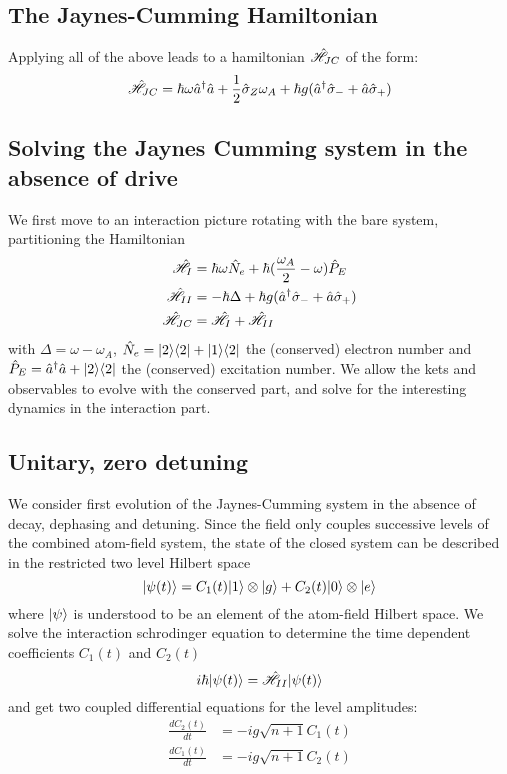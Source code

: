 \subsection{The Jaynes-Cumming Hamiltonian}
Applying all of the above leads to a hamiltonian $\hat{\mathscr{H}}_{JC}$ of the form:
\begin{equation}
	\hat{\mathscr{H}}_{JC} = \hbar \omega \hat{a}^\dagger \hat{a} +\frac{1}{2} \hat{\sigma}_Z \omega_A + \hbar g (\hat{a}^\dagger \hat{\sigma}_- + \hat{a} \hat{\sigma}_+)
\end{equation}
\subsection{Solving the Jaynes Cumming system in the absence of drive}
We first move to an interaction picture rotating with the bare system, partitioning the Hamiltonian
\begin{align}
	\hat{\mathscr{H}}_I &= \hbar \omega \hat{N}_e + \hbar(\frac{\omega_A}{2}-\omega)\hat{P}_E \\
	\hat{\mathscr{H}}_{II} &= -\hbar \Delta + \hbar g (\hat{a}^\dagger \hat{\sigma}_- + \hat{a} \hat{\sigma}_+) \\
	\hat{\mathscr{H}}_{JC} &= \hat{\mathscr{H}}_I+\hat{\mathscr{H}}_{II}
\end{align}
with $\Delta = \omega-\omega_A$,   $\hat{N}_e = | 2 \rangle \langle2 | + | 1 \rangle \langle2 | $ the (conserved) electron number and $\hat{P}_E = \hat{a}^\dagger\hat{a} + | 2 \rangle\langle2 | $ the (conserved) excitation number.
We allow the kets and observables to evolve with the conserved part, and solve for the interesting dynamics in the interaction part.
\subsection{Unitary, zero detuning}
We consider first evolution of the Jaynes-Cumming system in the absence of decay, dephasing and detuning.
Since the field only couples successive levels of the combined atom-field system, the state of the closed system can be described in the restricted two level Hilbert space
\begin{equation}
	| \psi(t) \rangle = C_1(t) | 1 \rangle \otimes| g \rangle + C_2(t) | 0 \rangle \otimes| e \rangle
\end{equation}
where $| \psi \rangle$ is understood to be an element of the atom-field Hilbert space.
We solve the interaction schrodinger equation to determine the time dependent coefficients $C_1(t)$ and $C_2(t)$
\begin{equation}
	i \hbar| \psi(t) \rangle = \hat{\mathscr{H}}_{II} | \psi(t) \rangle
\end{equation}
and get two coupled differential equations for the level amplitudes:
\begin{align}
	\frac{d C_2(t)}{dt} &= -i g \sqrt{n+1}C_1(t)\\
	\frac{d C_1(t)}{dt} &= -i g \sqrt{n+1}C_2(t)
\end{align}
